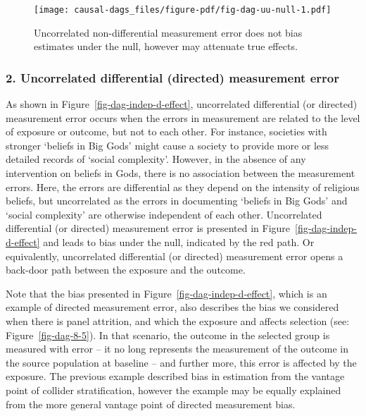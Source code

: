 \documentclass[
  singlecolumn]{report}
\begin{document}
\begin{figure}

{\centering \texttt{[image: causal-dags\_files/figure-pdf/fig-dag-uu-null-1.pdf]}

}

\caption{\label{fig-dag-uu-null}Uncorrelated non-differential
measurement error does not bias estimates under the null, however may
attenuate true effects.}

\end{figure}

\hypertarget{uncorrelated-differential-directed-measurement-error}{%
\subsubsection{\texorpdfstring{2. \textbf{Uncorrelated differential
(directed) measurement
error}}{2. Uncorrelated differential (directed) measurement error}}\label{uncorrelated-differential-directed-measurement-error}}

As shown in Figure~\ref{fig-dag-indep-d-effect}, uncorrelated
differential (or directed) measurement error occurs when the errors in
measurement are related to the level of exposure or outcome, but not to
each other. For instance, societies with stronger `beliefs in Big Gods'
might cause a society to provide more or less detailed records of
`social complexity'. However, in the absence of any intervention on
beliefs in Gods, there is no association between the measurement errors.
Here, the errors are differential as they depend on the intensity of
religious beliefs, but uncorrelated as the errors in documenting
`beliefs in Big Gods' and `social complexity' are otherwise independent
of each other. Uncorrelated differential (or directed) measurement error
is presented in Figure~\ref{fig-dag-indep-d-effect} and leads to bias
under the null, indicated by the red path. Or equivalently, uncorrelated
differential (or directed) measurement error opens a back-door path
between the exposure and the outcome.

Note that the bias presented in Figure~\ref{fig-dag-indep-d-effect},
which is an example of directed measurement error, also describes the
bias we considered when there is panel attrition, and which the exposure
and affects selection (see: Figure~\ref{fig-dag-8-5}). In that scenario,
the outcome in the selected group is measured with error -- it no long
represents the measurement of the outcome in the source population at
baseline -- and further more, this error is affected by the exposure.
The previous example described bias in estimation from the vantage point
of collider stratification, however the example may be equally explained
from the more general vantage point of directed measurement bias.
\end{document}
